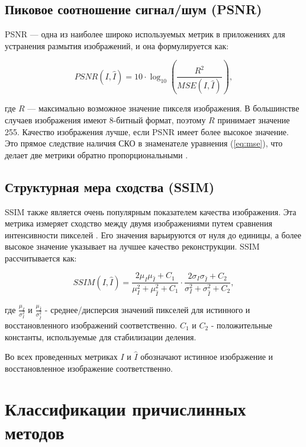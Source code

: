 \subsection{Пиковое соотношение сигнал/шум (PSNR)}

PSNR — одна из наиболее широко используемых метрик в приложениях для устранения размытия изображений, и она формулируется как:

\begin{equation}
	PSNR(I, \hat{I}) = 10 \cdot \log_{10} \left( \frac{R^{2}}{MSE(I, \hat{I})} \right),
\end{equation}

где \(R\) — максимально возможное значение пикселя изображения. В большинстве случаев изображения имеют 8-битный формат, поэтому \(R\) принимает значение 255. Качество изображения лучше, если PSNR имеет более высокое значение. Это прямое следствие наличия СКО в знаменателе уравнения (\ref{eq:mse}), что делает две метрики обратно пропорциональными \cite{hore2010image}.

\subsection{Структурная мера сходства (SSIM)}

SSIM также является очень популярным показателем качества изображения. Эта метрика измеряет сходство между двумя изображениями путем сравнения интенсивности пикселей \cite{wang2004image}. Его значения варьируются от нуля до единицы, а более высокое значение указывает на лучшее качество реконструкции. SSIM рассчитывается как:

\begin{equation}
	SSIM(I, \hat{I}) = \frac{{2\mu_I \mu_{\hat{I}} + C_1}}{{\mu_I^2 + \mu_{\hat{I}}^2 + C_1}} \cdot \frac{2\sigma_I \sigma_{\hat{I}} + C_2}{\sigma_I^2 + \sigma_{\hat{I}}^2 + C_2},
\end{equation}

где \(\frac{\mu_{I}}{\sigma_{I}^2}\) и \(\frac{\mu_{\hat{I}}}{\sigma_{\hat{I}}^2}\) - среднее/дисперсия значений пикселей для истинного и восстановленного изображений соответственно. \(C_1\) и \(C_2\) - положительные константы, используемые для стабилизации деления.

Во всех проведенных метриках \(I\) и \(\hat{I}\) обозначают истинное изображение и восстановленное изображение соответственно.

\section{Классификации причислинных методов}

